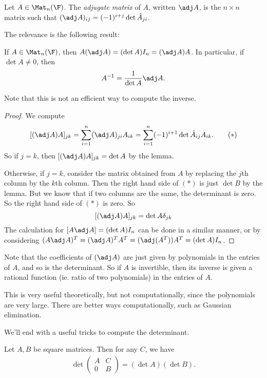 \documentclass[a4paper]{article}
\begin{document}
\begin{defi}
  Let $A \in \Mat_n(\F)$. The \emph{adjugate matrix} of $A$, written $\adj A$, is the $n\times n$ matrix such that $(\adj A)_{ij} = (-1)^{i + j} \det\hat{A}_{ji}$.
\end{defi}

The relevance is the following result:
\begin{thm}[]
  If $A \in \Mat_n(\F)$, then $A(\adj A) = (\det A) I_n = (\adj A)A$. In particular, if $\det A \not= 0$, then
  \[
    A^{-1} = \frac{1}{\det A}\adj A.
  \]
\end{thm}
Note that this is not an efficient way to compute the inverse.

\begin{proof}
  We compute
  \[
    [(\adj A)A]_{jk} = \sum_{i = 1}^n (\adj A)_{ji} A_{ik} = \sum_{i = 1}^n (-1)^{i + 1} \det\hat{A}_{ij} A_{ik}.\tag{$*$}
  \]
  So if $j = k$, then $[(\adj A)A]_{jk} = \det A$ by the lemma.

  Otherwise, if $j = k$, consider the matrix obtained from $A$ by replacing the $j$th column by the $k$th column. Then the right hand side of $(*)$ is just $\det B$ by the lemma. But we know that if two columns are the same, the determinant is zero. So the right hand side of $(*)$ is zero. So
  \[
    [(\adj A)A]_{jk} = \det A \delta_{jk}
  \]
  The calculation for $[A\adj A] = (\det A) I_n$ can be done in a similar manner, or by considering $(A\adj A)^T = (\adj A)^T A^T = (\adj (A^T)) A^T = (\det A) I_n$.
\end{proof}
Note that the coefficients of $(\adj A)$ are just given by polynomials in the entries of $A$, and so is the determinant. So if $A$ is invertible, then its inverse is given a rational function (ie. ratio of two polynomials) in the entries of $A$.

This is very useful theoretically, but not computationally, since the polynomials are very large. There are better ways computationally, such as Gaussian elimination.

We'll end with a useful tricks to compute the determinant.
\begin{lemma}
  Let $A, B$ be square matrices. Then for any $C$, we have
  \begin{align*}
    \det
    \begin{pmatrix}
      A & C\\
      0 & B
    \end{pmatrix}
    = (\det A) (\det B).
  \end{align*}
\end{lemma}
\end{document}

